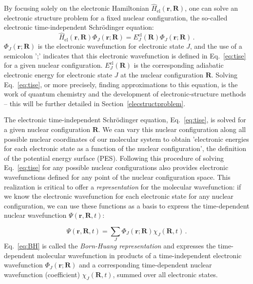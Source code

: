 \documentclass[9pt,bestpractices,pubversion]{livecoms}
\begin{document}
By focusing solely on the electronic Hamiltonian $\hat{H}_{\text{el}}(\mathbf{r},\mathbf{R})$, one can solve an electronic structure problem for a fixed nuclear configuration, the so-called electronic time-independent Schr\"{o}dinger equation:
\begin{equation}
\hat{H}_{\text{el}}(\mathbf{r},\mathbf{R}) \Phi_J(\mathbf{r};\mathbf{R}) = E^{\text{el}}_{J}(\mathbf{R})\Phi_J(\mathbf{r};\mathbf{R}) \, .
\label{eq:tise}
\end{equation}
$\Phi_J(\mathbf{r};\mathbf{R})$ is the electronic wavefunction for electronic state $J$, and the use of a semicolon ';' indicates that this electronic wavefunction is defined in Eq.~\eqref{eq:tise} for a given nuclear configuration.  $E^{\text{el}}_{J}(\mathbf{R})$ is the corresponding adiabatic electronic energy for electronic state $J$ at the nuclear configuration $\mathbf{R}$. Solving Eq.~\ref{eq:tise}, or more precisely, finding approximations to this equation, is the work of quantum chemistry and the development of electronic-structure methods -- this will be further detailed in Section~\ref{elecstructproblem}.

The electronic time-independent Schr\"{o}dinger equation, Eq.~\eqref{eq:tise}, is solved for a given nuclear configuration $\mathbf{R}$. We can vary this nuclear configuration along all possible nuclear coordinates of our molecular system to obtain 'electronic energies for each electronic state as a function of the nuclear configuration', the definition of the potential energy surface (PES). Following this procedure of solving Eq.~\ref{eq:tise} for any possible nuclear configurations also provides electronic wavefunctions defined for any point of the nuclear configuration space. This realization is critical to offer a \textit{representation} for the molecular wavefunction: if we know the electronic wavefunction for each electronic state for any nuclear configuration, we can use these functions as a basis to express the time-dependent nuclear wavefunction $\Psi(\mathbf{r},\mathbf{R},t)$:

\begin{equation}
\Psi(\mathbf{r},\mathbf{R},t)=\sum_J\Phi_J(\mathbf{r};\mathbf{R})\chi_J(\mathbf{R},t) \, .
\label{eq:BH}
\end{equation}
Eq.~\eqref{eq:BH} is called the \textit{Born-Huang representation} and expresses the time-dependent molecular wavefunction in products of a time-independent electronic wavefunction $\Phi_J(\mathbf{r};\mathbf{R})$ and a corresponding time-dependent nuclear wavefunction (coefficient) $\chi_J(\mathbf{R},t)$, summed over all electronic states. 
\end{document}

